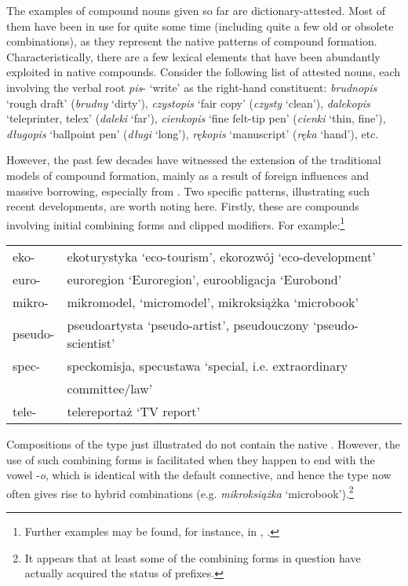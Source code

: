 \documentclass[output=paper]{LSP/langsci}
\begin{document}
{The examples of  compound nouns given so far are dictionary-attested. Most of them have been in use for quite some time (including quite a few old or obsolete combinations), as they represent the native  patterns of compound formation. Characteristically, there are a few lexical elements that have been abundantly exploited in native compounds. Consider the following list of attested nouns, each involving the verbal root} {\textit{pis}}{- ‘write’ as the right-hand constituent:} {\textit{brudnopis}} {‘rough draft’ (}{\textit{brudny}} {‘dirty’),} {\textit{czystopis}} {‘fair copy’ (}{\textit{czysty}} {‘clean’),} {\textit{dalekopis}} {‘teleprinter, telex’ (}{\textit{daleki}} {‘far’),} {\textit{cienkopis}} {‘fine felt-tip pen’ (}{\textit{cienki}} {‘thin, fine’),} {\textit{długopis}} {‘ballpoint pen’ (}{\textit{długi}} {‘long’),} {\textit{rękopis}} {‘manuscript’ (}{\textit{ręka}} {‘hand’), etc.}



{However, the past few decades have witnessed the extension of the traditional  models of compound formation, mainly as a result of foreign influences and massive borrowing, especially from . Two specific patterns, illustrating such recent developments, are worth noting here. Firstly, these are compounds involving initial combining forms and clipped modifiers. For example:}\footnote{{Further examples may be found, for instance, in \citet[94]{Jadacka2001}, \citet{Waszakowa2015}.}}

\ea\label{ex:szymanek:9} 
\begin{tabularx}{\linewidth}[t]{ll}
eko-  &  ekoturystyka ‘eco-tourism’, ekorozwój ‘eco-development’\\
euro-  &  euroregion ‘Euroregion’, euroobligacja ‘Eurobond’\\
mikro-  &   mikromodel, ‘micromodel’, mikroksiążka ‘microbook’\\
pseudo- &   pseudoartysta ‘pseudo-artist’, pseudouczony ‘pseudo-scientist’\\
spec-  &  speckomisja, specustawa ‘special, i.e. extraordinary \\
& committee/law’\\
tele- &   telereportaż ‘TV report’\\
\end{tabularx}
\z 

Compositions of the type just illustrated do not contain the native . However, the use of such combining forms is facilitated when they happen to end with the vowel -\textit{o}, which is identical with the  default connective, and hence the type now often gives rise to hybrid combinations (e.g. \textit{mikroksiążka} ‘microbook’).\footnote{It appears that at least some of the combining forms in question have actually acquired the status of prefixes.}
\end{document}
